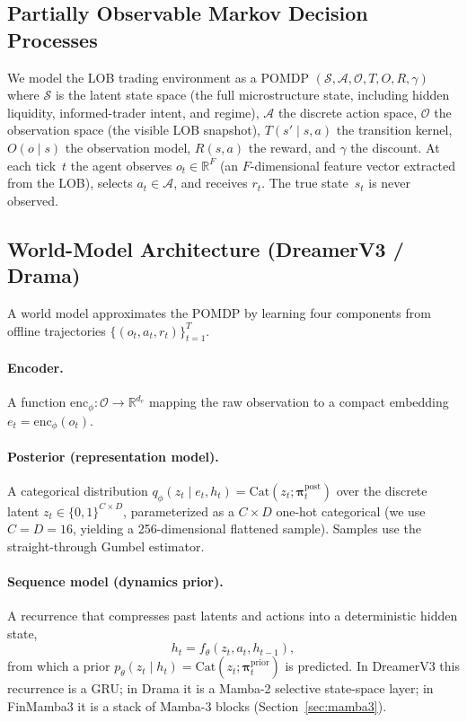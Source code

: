 \documentclass{article}
\newcommand{\R}{\mathbb{R}}
\newcommand{\ot}{o_t}
\newcommand{\at}{a_t}
\newcommand{\rt}{r_t}
\newcommand{\zt}{z_t}
\newcommand{\hstate}{h_t}
\begin{document}
\subsection{Partially Observable Markov Decision Processes}

We model the LOB trading environment as a POMDP
$(\mathcal{S}, \mathcal{A}, \mathcal{O}, T, O, R, \gamma)$ where
$\mathcal{S}$ is the latent state space (the full microstructure state,
including hidden liquidity, informed-trader intent, and regime),
$\mathcal{A}$ the discrete action space,
$\mathcal{O}$ the observation space (the visible LOB snapshot),
$T(s'\mid s, a)$ the transition kernel,
$O(o \mid s)$ the observation model,
$R(s, a)$ the reward, and $\gamma$ the discount.  At each tick~$t$ the
agent observes $\ot \in \R^F$ (an $F$-dimensional feature vector
extracted from the LOB), selects $\at \in \mathcal{A}$, and receives
$\rt$.  The true state~$s_t$ is never observed.

\subsection{World-Model Architecture (DreamerV3 / Drama)}

A world model approximates the POMDP by learning four components from
offline trajectories $\{(\ot, \at, \rt)\}_{t=1}^{T}$.

\paragraph{Encoder.}
A function $\mathrm{enc}_\phi: \mathcal{O} \to \R^{d_e}$ mapping the raw
observation to a compact embedding $e_t = \mathrm{enc}_\phi(\ot)$.

\paragraph{Posterior (representation model).}
A categorical distribution
$q_\phi(\zt \mid e_t, \hstate) = \mathrm{Cat}(\zt; \bm{\pi}^{\text{post}}_t)$
over the discrete latent $\zt \in \{0,1\}^{C \times D}$, parameterized
as a $C \times D$ one-hot categorical (we use $C = D = 16$, yielding a
256-dimensional flattened sample).  Samples use the straight-through
Gumbel estimator.

\paragraph{Sequence model (dynamics prior).}
A recurrence that compresses past latents and actions into a
deterministic hidden state,
\begin{equation}\label{eq:sequence_model}
  \hstate = f_\theta(\zt, \at, h_{t-1}),
\end{equation}
from which a prior $p_\theta(\zt \mid \hstate) = \mathrm{Cat}(\zt;
\bm{\pi}^{\text{prior}}_t)$ is predicted.  In DreamerV3 this recurrence
is a GRU; in Drama it is a Mamba-2 selective state-space layer; in
FinMamba3 it is a stack of Mamba-3 blocks
(Section~\ref{sec:mamba3}).
\end{document}
